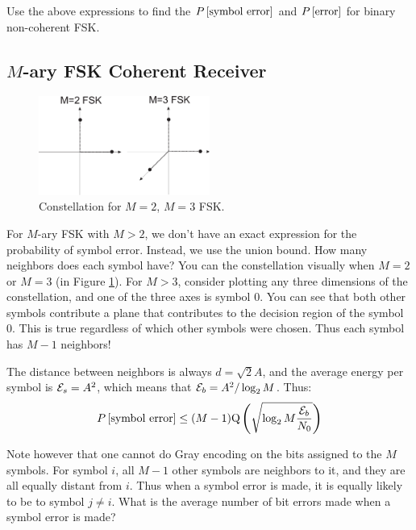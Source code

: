   Use the
above expressions to find the $P\left[{\mbox{symbol error}}\right]$ and
$P\left[{\mbox{error}}\right]$ for binary non-coherent FSK.

\Solution{
\[
\PR{\mbox{symbol error}} =  \PR{\mbox{bit error}} =
\frac{1}{2}e^{-\frac{1}{2}\Ebno}
\]
}

\subsection{$M$-ary FSK Coherent Receiver}

\begin{figure}
    \centering
    \includegraphics[width=0.5\textwidth]{../images/FSK-signalSpaceDiagram.eps}
    \caption{Constellation for $M=2$, $M=3$ FSK.}
    \label{F:FSK_constellation}
\end{figure}

For $M$-ary FSK with $M>2$, we don't have an exact expression for the probability of symbol error.  Instead, we use the union bound.  How many neighbors does each symbol have?  You can the constellation visually when $M=2$ or $M=3$ (in Figure \ref{F:FSK_constellation}).  For $M>3$, consider plotting any three dimensions of the constellation, and one of the three axes is symbol 0. You can see that both other symbols contribute a plane that contributes to the decision region of the symbol 0.  This is true regardless of which other symbols were chosen.  Thus each symbol has $M-1$ neighbors! 

The distance between neighbors is always $d=\sqrt{2}A$, and the average energy per symbol is $\mathcal{E}_s = A^2$, which means that $\mathcal{E}_b = A^2 / \log_2 M$.  Thus:
\begin{equation}
    P\left[{\mbox{symbol error}}\right] \le 
      (M-1) {\mbox{Q}\left( { \sqrt{\log_2 M \frac{\mathcal{E}_b }{N_0}}} \right)}
\end{equation}

Note however that one cannot do Gray encoding on the bits assigned to the $M$ symbols.  For symbol $i$, all $M-1$ other symbols are neighbors to it, and they are all equally distant from $i$.  Thus when a symbol error is made, it is equally likely to be to symbol $j\neq i$.  What is the average number of bit errors made when a symbol error is made?  

